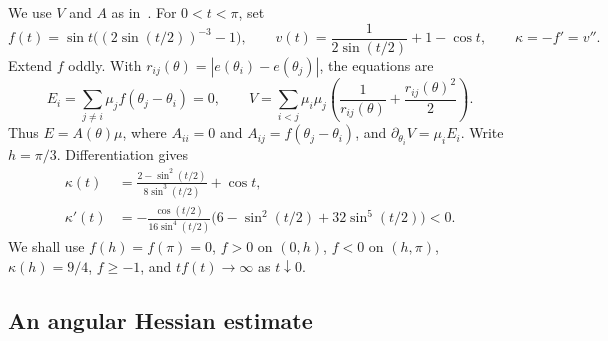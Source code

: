 \documentclass[11pt,a4paper]{article}
\numberwithin{equation}{section}
\theoremstyle{remark}
\begin{document}
We use $V$ and $A$ as in~\cite[Section~2]{CCLM}. For $0<t<\pi$, set
\begin{equation}\label{eq:kernel}
 f(t)=\sin t\bigl((2\sin(t/2))^{-3}-1\bigr),\qquad
 v(t)=\frac1{2\sin(t/2)}+1-\cos t,\qquad \kappa=-f'=v''.
\end{equation}
Extend $f$ oddly. With $r_{ij}(\theta)=|e(\theta_i)-e(\theta_j)|$, the equations are
\begin{equation}\label{eq:co-equations}
 E_i=\sum_{j\ne i}\mu_jf(\theta_j-\theta_i)=0,\qquad
 V=\sum_{i<j}\mu_i\mu_j
 \left(\frac1{r_{ij}(\theta)}+\frac{r_{ij}(\theta)^2}{2}\right).
\end{equation}
Thus $E=A(\theta)\mu$, where $A_{ii}=0$ and
$A_{ij}=f(\theta_j-\theta_i)$, and $\partial_{\theta_i}V=\mu_iE_i$.
Write $h=\pi/3$. Differentiation gives
\begin{equation}\label{eq:kappa}
 \begin{split}
 \kappa(t)&=\frac{2-\sin^2(t/2)}{8\sin^3(t/2)}+\cos t,\\
 \kappa'(t)&=-\frac{\cos(t/2)}{16\sin^4(t/2)}
 \bigl(6-\sin^2(t/2)+32\sin^5(t/2)\bigr)<0.
 \end{split}
\end{equation}
We shall use $f(h)=f(\pi)=0$, $f>0$ on $(0,h)$, $f<0$ on $(h,\pi)$,
$\kappa(h)=9/4$, $f\ge-1$, and $tf(t)\to\infty$ as $t\downarrow0$.

\subsection{An angular Hessian estimate}
\end{document}
